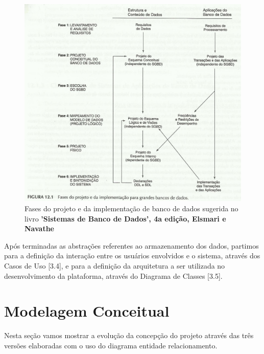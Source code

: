 \documentclass[graduacao,brazil]{ThesisPUC}
\begin{document}
\begin{figure}[H]
    \centering
    \includegraphics[width=\linewidth]{Imagens/fases_projeto_banco_dados.jpg}
    \caption{Fases do projeto e da implementação de banco de dados sugerida no livro 
	     \textbf{'Sistemas de Banco de Dados', 4a edição, Elsmari e Navathe}}
\end{figure}

Ap\'{o}s terminadas as abstra\c{c}\~{o}es referentes ao armazenamento dos dados, partimos para a
defini\c{c}\~{a}o da intera\c{c}\~{a}o entre os usu\'{a}rios envolvidos e o sistema, atrav\'{e}s dos Casos de Uso [3.4], e
para a defini\c{c}\~{a}o da arquitetura a ser utilizada no desenvolvimento da plataforma, atrav\'{e}s do
Diagrama de Classes [3.5].


\section{Modelagem Conceitual}

Nesta se\c{c}\~{a}o vamos mostrar a evolu\c{c}\~{a}o da concep\c{c}\~{a}o do projeto atrav\'{e}s das tr\^{e}s vers\~{o}es
elaboradas com o uso do diagrama entidade relacionamento.
\end{document}
